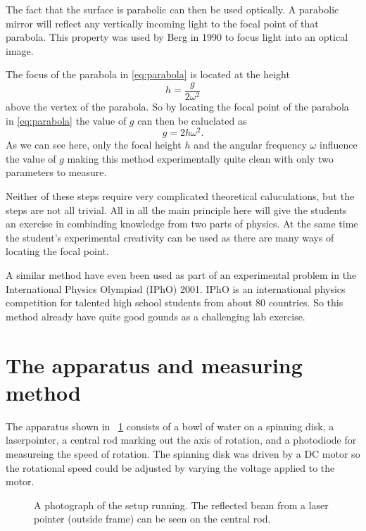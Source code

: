 \documentclass[11pt,towcolumn, swedish, english]{article}
\newcommand{\figref}{\figurename~\ref}
\begin{document}
The fact that the surface is parabolic can then be used optically. A parabolic
mirror will reflect any vertically incoming light to the focal point of that
parabola. This property was used by Berg\cite{Berg1990} in 1990 to focus light
into an optical image. 

The focus of the parabola in \eqref{eq:parabola} is located at the
height \cite{Physics_Handbook} 
\begin{equation*}
h=\frac{g}{2\omega^2}
\end{equation*}
above the vertex of the parabola. So by locating the focal point of the parabola in \eqref{eq:parabola} the value of
$g$ can then be caluclated as
\begin{equation*}
g=2h\omega^2.
\end{equation*}
As we can see here, only the focal height $h$ and the angular
frequency $\omega$ influence the value of $g$ making this method
experimentally quite clean with only two parameters to measure. 

Neither of these steps require very complicated theoretical caluculations, but
the steps are not all trivial. All in all the main principle here will give the
students an exercise in combinding knowledge from two parts of physics. At the
same time the student's experimental creativity can be used as there are many
ways of locating the focal point. 

A similar method have even been used as part of an
experimental problem in the International Physics Olympiad (IPhO)
2001\cite{IPhO2001}. IPhO is an international physics competition for
talented high school students from about 80 countries. So this method
already have quite good gounds as a challenging lab exercise.


\section{The apparatus and measuring method}
The apparatus shown in \figref{fig:rot_bowl_pic} consists of a bowl of water
on a spinning disk, a laserpointer, a central rod marking out the axis of
rotation, and a photodiode for measureing the speed of rotation. The spinning
disk was driven by a DC motor so the rotational speed could be adjusted by varying
the voltage applied to the motor. 

\begin{figure}
\centering
\resizebox{0.8\linewidth}{!}{}
\caption{\label{fig:rot_bowl_pic} A photograph of the setup running. The
  reflected beam from a laser pointer (outside frame) can be seen on
  the central rod. } 
\end{figure}
\end{document}
